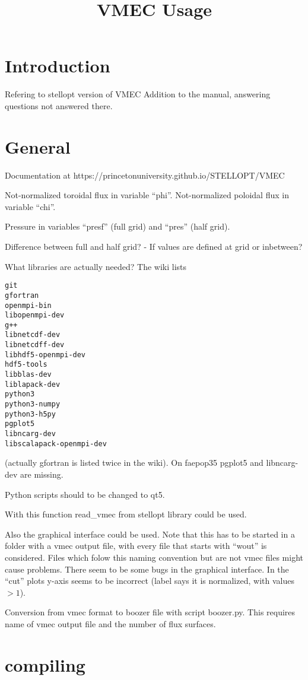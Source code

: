 \documentclass{article}
\title{\textbf{VMEC Usage}}
\begin{document}
\maketitle

\section{Introduction}
Refering to stellopt version of VMEC
Addition to the manual, answering questions not answered there.


\section{General}
Documentation at https://princetonuniversity.github.io/STELLOPT/VMEC

Not-normalized toroidal flux in variable ``phi''.
Not-normalized poloidal flux in variable ``chi''.

Pressure in variables ``presf'' (full grid) and ``pres'' (half grid).

Difference between full and half grid?
- If values are defined at grid or inbetween?

What libraries are actually needed?
The wiki lists
\begin{verbatim}
git
gfortran
openmpi-bin
libopenmpi-dev
g++
libnetcdf-dev
libnetcdff-dev
libhdf5-openmpi-dev
hdf5-tools
libblas-dev
liblapack-dev
python3
python3-numpy
python3-h5py
pgplot5
libncarg-dev
libscalapack-openmpi-dev
\end{verbatim}
(actually gfortran is listed twice in the wiki).
On faepop35 pgplot5 and libncarg-dev are missing.

Python scripts should to be changed to qt5.

With this function read\_vmec from stellopt library could be used.

Also the graphical interface could be used. Note that this has to be
started in a folder with a vmec output file, with every file that starts
with ``wout'' is considered. Files which folow this naming convention but
are not vmec files might cause problems.
There seem to be some bugs in the graphical interface. In the ``cut''
plots y-axis seems to be incorrect (label says it is normalized, with
values $> 1$).

Conversion from vmec format to boozer file with script boozer.py. This
requires name of vmec output file and the number of flux surfaces.


\section{compiling}
\end{document}
